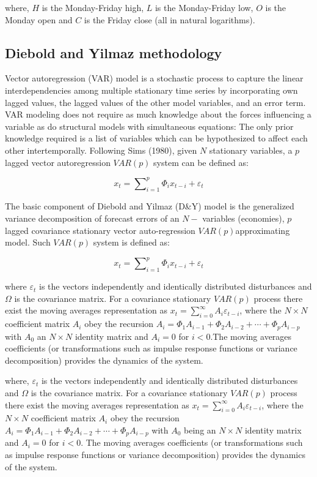 \documentclass[]{elsarticle} %
\begin{document}
where, \(H\) is the Monday-Friday high, \(L\) is the Monday-Friday low,
\(O\) is the Monday open and \(C\) is the Friday close (all in natural
logarithms).

\subsection{Diebold and Yilmaz
methodology}\label{diebold-and-yilmaz-methodology}

Vector autoregression (VAR) model is a stochastic process to capture the
linear interdependencies among multiple stationary time series by
incorporating own lagged values, the lagged values of the other model
variables, and an error term. VAR modeling does not require as much
knowledge about the forces influencing a variable as do structural
models with simultaneous equations: The only prior knowledge required is
a list of variables which can be hypothesized to affect each other
intertemporally. Following Sims (1980), given \(N\) stationary
variables, a \(p\) lagged vector autoregression \(VAR\left( p \right)\)
system can be defined as:

\[{{x}_{t}}=\sum\nolimits_{i=1}^{p}{{{\Phi }_{i}}{{x}_{t-i}}+{{\varepsilon }_{t}}}\]

The basic component of Diebold and Yilmaz (D\&Y) model is the
generalized variance decomposition of forecast errors of an \(N-\)
variables (economies), \(p\) lagged covariance stationary vector
auto-regression \(VAR\left( p \right)\)approximating model. Such
\(VAR\left( p \right)\) system is defined as:

\[{{x}_{t}}=\sum\nolimits_{i=1}^{p}{{{\Phi }_{i}}{{x}_{t-i}}+{{\varepsilon }_{t}}}\]

where \({{\varepsilon }_{t}}\) is the vectors independently and
identically distributed disturbances and \(\Omega\) is the covariance
matrix. For a covariance stationary \(VAR\left( p \right)\) process
there exist the moving averages representation as
\({{x}_{t}}=\sum\nolimits_{i=0}^{\infty }{{{A}_{i}}{{\varepsilon }_{t-i}}}\),
where the \(N\times N\) coefficient matrix \({{A}_{i}}\) obey the
recursion
\({{A}_{i}}={{\Phi }_{1}}{{A}_{i-1}}+{{\Phi }_{2}}{{A}_{i-2}}+\cdots +{{\Phi }_{p}}{{A}_{i-p}}\)
with \({{A}_{0}}\) an \(N\times N\) identity matrix and \({{A}_{i}}=0\)
for \(i<0\).The moving averages coefficients (or transformations such as
impulse response functions or variance decomposition) provides the
dynamics of the system.

where, \({{\varepsilon }_{t}}\) is the vectors independently and
identically distributed disturbances and \(\Omega\) is the covariance
matrix. For a covariance stationary \(VAR\left( p \right)\) process
there exist the moving averages representation as
\({{x}_{t}}=\sum\nolimits_{i=0}^{\infty }{{{A}_{i}}{{\varepsilon }_{t-i}}}\),
where the \(N\times N\) coefficient matrix \({{A}_{i}}\) obey the
recursion
\({{A}_{i}}={{\Phi }_{1}}{{A}_{i-1}}+{{\Phi }_{2}}{{A}_{i-2}}+\cdots +{{\Phi }_{p}}{{A}_{i-p}}\)
with \({{A}_{0}}\) being an \(N\times N\) identity matrix and
\({{A}_{i}}=0\) for \(i<0\). The moving averages coefficients (or
transformations such as impulse response functions or variance
decomposition) provides the dynamics of the system.
\end{document}
